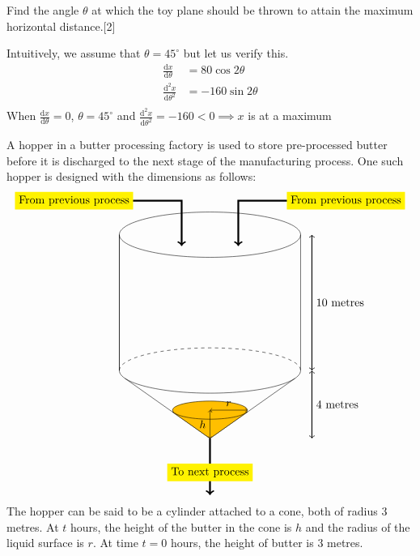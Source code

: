 \documentclass[12pt, a4 paper]{article}
\begin{document}
\begin{outline}[enumerate]
 \2 Find the angle \(\theta\) at which the toy plane should be thrown to attain the maximum horizontal distance.\hfill[2]
 \begin{answer}
  Intuitively, we assume that \(\theta=45^\circ\) but let us verify this.
  \begin{align*}
   \frac{\mathrm{d}x}{\mathrm{d}\theta}     & = 80\cos2\theta   \\
   \frac{\mathrm{d}^2x}{\mathrm{d}\theta^2} & = -160\sin2\theta \\
  \end{align*}
  When \(\frac{\mathrm{d}x}{\mathrm{d}\theta}=0\), \(\theta=45^\circ\) and \(\frac{\mathrm{d}^2x}{\mathrm{d}\theta^2}=-160<0\implies x\) is at a maximum
 \end{answer}

 \1 A hopper in a butter processing factory is used to store pre-processed butter before it is discharged to the next stage of the manufacturing process. One such hopper is designed with the dimensions as follows: %
 \[
  \begin{tikzpicture}
   \draw (0,0) ellipse (80pt and 20pt); %
   \draw (-80pt,0) -- (-80pt,-120pt);
   \draw (80pt,0) -- (80pt,-120pt);
   \draw (-80pt,0) -- (-80pt,-120pt);
   \draw[dashed] (-80pt,-120pt) arc (180:0:80pt and 20pt);
   \draw (-80pt,-120pt) arc (180:360:80pt and 20pt);
   \draw[<->,thick] (90pt,0) -- (90pt,-60pt) node[right] {10 metres} -- (90pt,-120pt);%
   \draw (-75pt,-127pt) -- (0, -180pt); %
   \draw (0,-180pt) -- (75pt,-127pt);
   \draw[<->,thick] (90pt,-120pt) -- (90pt,-150pt) node[right] {4 metres} -- (90pt,-180pt);%
   \draw[->,ultra thick] (-120pt,30pt) node [fill=yellow]{From previous process}-- (-25pt,30pt) -- (-25pt,-10pt); %
   \draw[->,ultra thick] (120pt,30pt) node [fill=yellow]{From previous process}-- (25pt,30pt) -- (25pt,-10pt);
   \draw[->,ultra thick] (0,-180pt) -- (0,-210pt) node[fill=yellow]{To next process} -- (0,-230pt); %
   \filldraw [orange!50!yellow,draw=black](0,-180pt) -- (33pt,-156.68pt) -- (-33pt,-156.68pt) -- cycle; %
   \filldraw [orange!50!yellow,draw=black](0,-155pt) ellipse (33pt and 8pt);
   \draw[<->] (0,-155pt) -- (16.5pt, -155pt) node [above]{\(r\)}-- (33pt,-155pt);
   \draw[<->] (0,-155pt) -- (0, -167.5pt) node [left]{\(h\)}-- (0,-180pt); %
  \end{tikzpicture}
 \]
 The hopper can be said to be a cylinder attached to a cone, both of radius 3 metres. At \(t\) hours, the height of the butter in the cone is \(h\) and the radius of the liquid surface is \(r\). At time \(t = 0\) hours, the height of butter is 3 metres.\newline

\end{outline}
\end{document}
